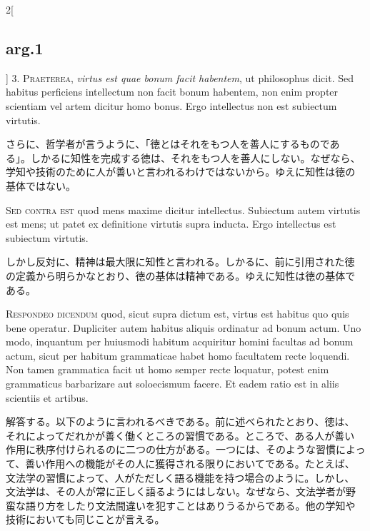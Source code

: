 \documentclass[paper=a4paper,fontsize=10pt,jafontsize=9pt,titlepage]{jlreq}
\begin{document}
\begin{paracol}{2}[\subsection{arg.1}]
3. {\scshape Praeterea}, {\itshape virtus est quae bonum facit
habentem}, ut philosophus dicit. Sed habitus perficiens intellectum
non facit bonum habentem, non enim propter scientiam vel artem dicitur
homo bonus. Ergo intellectus non est subiectum virtutis.

\switchcolumn

さらに、哲学者が言うように、「徳とはそれをもつ人を善人にするものであ
る」。しかるに知性を完成する徳は、それをもつ人を善人にしない。なぜなら、
学知や技術のために人が善いと言われるわけではないから。ゆえに知性は徳の
基体ではない。

\switchcolumn*[\subsection{s.c.}]

{\scshape Sed contra est} quod mens maxime dicitur
intellectus. Subiectum autem virtutis est mens; ut patet ex
definitione virtutis supra inducta. Ergo intellectus est subiectum
virtutis.

\switchcolumn

しかし反対に、精神は最大限に知性と言われる。しかるに、前に引用された徳
の定義から明らかなとおり、徳の基体は精神である。ゆえに知性は徳の基体で
ある。


{\scshape Respondeo dicendum} quod, sicut supra dictum est, virtus est
habitus quo quis bene operatur. Dupliciter autem habitus aliquis
ordinatur ad bonum actum. Uno modo, inquantum per huiusmodi habitum
acquiritur homini facultas ad bonum actum, sicut per habitum
grammaticae habet homo facultatem recte loquendi. Non tamen grammatica
facit ut homo semper recte loquatur, potest enim grammaticus
barbarizare aut soloecismum facere. Et eadem ratio est in aliis
scientiis et artibus.

\switchcolumn

解答する。以下のように言われるべきである。前に述べられたとおり、徳は、
それによってだれかが善く働くところの習慣である。ところで、ある人が善い
作用に秩序付けられるのに二つの仕方がある。一つには、そのような習慣によっ
て、善い作用への機能がその人に獲得される限りにおいてである。たとえば、
文法学の習慣によって、人がただしく語る機能を持つ場合のように。しかし、
文法学は、その人が常に正しく語るようにはしない。なぜなら、文法学者が野
蛮な語り方をしたり文法間違いを犯すことはありうるからである。他の学知や
技術においても同じことが言える。


\end{paracol}
\end{document}
